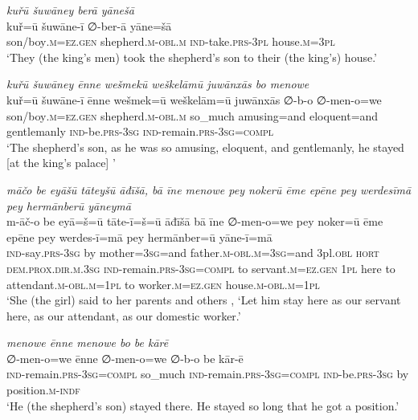 \ea \label{KŠ.41}
\textit{kuřū šuwāney berā yānešā} \\ 
\gll kuř=ū šuwāne-ī ∅-ber-ā yāne=šā \\ 
 son/boy\textsc{.m}\textsc{=ez.gen} shepherd\textsc{.m}\textsc{-obl}\textsc{.m} \textsc{ind-}take\textsc{.prs}\textsc{-3pl} house\textsc{.m}\textsc{=3pl} \\ 
\glt `They (the king’s men) took the shepherd’s son to their (the king’s) house.'
\z 
 
\ea \label{KŠ.42}
\textit{kuřū šuwāney ēnne wešmekū weškelāmū juwānxās bo menowe} \\ 
\gll kuř=ū šuwāne-ī ēnne wešmek=ū weškelām=ū juwānxās ∅-b-o ∅-men-o=we \\ 
 son/boy\textsc{.m}\textsc{=ez.gen} shepherd\textsc{.m}\textsc{-obl}\textsc{.m} so\_much amusing=and eloquent=and gentlemanly \textsc{ind-}be\textsc{.prs}\textsc{-3sg} \textsc{ind-}remain\textsc{.prs}\textsc{-3sg}\textsc{=compl} \\ 
\glt `The shepherd’s son, as he was so amusing, eloquent, and gentlemanly, he stayed [at the king’s palace] '
\z 
 
\ea \label{KŠ.43}
\textit{māčo be eyāšū tāteyšū āđīšā, bā īne menowe pey nokerū ēme epēne pey werdesīmā pey hermānberū yāneymā} \\ 
\gll m-āč-o be eyā=š=ū tāte-ī=š=ū āđīšā bā īne ∅-men-o=we pey noker=ū ēme epēne pey werdes-ī=mā pey hermānber=ū yāne-ī=mā \\ 
 \textsc{ind-}say\textsc{.prs}\textsc{-3sg} by mother\textsc{=3sg}=and father\textsc{.m}\textsc{-obl}\textsc{.m}\textsc{=3sg}=and 3pl\textsc{.obl} \textsc{hort} \textsc{dem.prox}\textsc{.dir}\textsc{.m}\textsc{.3sg} \textsc{ind-}remain\textsc{.prs}\textsc{-3sg}\textsc{=compl} to servant\textsc{.m}\textsc{=ez.gen} \textsc{1pl} here to attendant\textsc{.m}\textsc{-obl}\textsc{.m}\textsc{=\textsc{1pl}} to worker\textsc{.m}\textsc{=ez.gen} house\textsc{.m}\textsc{-obl}\textsc{.m}\textsc{=\textsc{1pl}} \\ 
\glt `She (the girl) said to her parents and others , ‘Let him stay here as our servant here, as our attendant, as our domestic worker.'
\z 
 
\ea \label{KŠ.44}
\textit{menowe ēnne menowe bo be kārē} \\ 
\gll ∅-men-o=we ēnne ∅-men-o=we ∅-b-o be kār-ē \\ 
 \textsc{ind-}remain\textsc{.prs}\textsc{-3sg}\textsc{=compl} so\_much \textsc{ind-}remain\textsc{.prs}\textsc{-3sg}\textsc{=compl} \textsc{ind-}be\textsc{.prs}\textsc{-3sg} by position\textsc{.m}\textsc{-indf} \\ 
\glt `He (the shepherd’s son) stayed there. He stayed so long that he got a position.'
\z 
 
